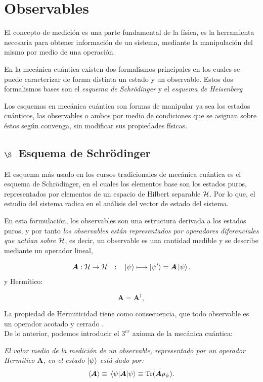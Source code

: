 \documentclass[../Main.tex]{subfiles}
\begin{document}
\section{Observables}
El concepto de medición es una parte fundamental de la física, es la herramienta necesaria para obtener información de un sistema, mediante la manipulación del mismo por medio de una operación.

En la mecánica cuántica existen dos formalismos principales en los cuales se puede caracterizar de forma distinta un estado y un observable. Estos dos formalismos bases son el \emph{esquema de Schrödinger} y el \emph{esquema de Heisenberg}

Los esquemas en mecánica cuántica son formas de manipular ya sea los estados cuánticos, las observables o ambos por medio de condiciones que se asignan sobre éstos según convenga, sin modificar sus propiedades físicas.

\subsection*{$\S$~Esquema de Schrödinger}

El esquema más usado en los cursos tradicionales de mecánica cuántica es el esquema de Schrödinger, en el cuales los elementos base son los estados puros, representados por elementos de un espacio de Hilbert separable $\mathcal{H}$. Por lo que, el estudio del sistema radica en el análisis del vector de estado del sistema.

En esta formulación, los observables son una estructura derivada a los estados puros, y por tanto \emph{los observables están representados por operadores diferenciales que actúan sobre $\mathcal{H}$}, es decir, un observable es una cantidad medible y se describe mediante un operador lineal,

\begin{equation}
    \bm{A}:\H\to\H\qq{:}\ket{\psi}\longmapsto\ket{\psi'}=\bm{A}\ket{\psi},
\end{equation}
y Hermítico:

\begin{equation}
    \bm{A}=\bm{A}^\dagger,
\end{equation}

La propiedad de Hermiticidad tiene como consecuencia, que todo observable es un operador acotado y cerrado \cite{DellAntonio}.\\ De lo anterior, podemos introducir el $3^{er}$ axioma de la mecánica cuántica:

\emph{El valor medio de la medición de un observable, representado por un operador Hermítico $\bm{A}$, en el estado $\ket{\psi}$ está dado por:}
\begin{equation}
    \expval{\bm{A}}\equiv\expval{\bm{A}}{\psi}\equiv\Tr(\bm{A}\rho_\psi).
\end{equation}
\end{document}
